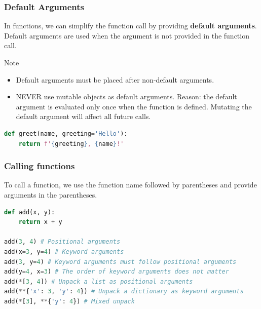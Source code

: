 \documentclass[beamer, en, version=2.0]{huangfusl-template}
\begin{document}
    \begin{frame}[fragile]
        \frametitle{Default Arguments}

        In functions, we can simplify the function call by providing \textbf{default arguments}. Default arguments are used when the argument is not provided in the function call.

        \begin{block}{Note}
            \begin{itemize}
                \item Default arguments must be placed after non-default arguments.
                \item NEVER use mutable objects as default arguments. Reason: the default argument is evaluated only once when the function is defined. Mutating the default argument will affect all future calls.
            \end{itemize}
        \end{block}

\begin{lstlisting}[language=python]
def greet(name, greeting='Hello'):
    return f'{greeting}, {name}!'
\end{lstlisting}
    \end{frame}
    \begin{frame}[fragile]
        \frametitle{Calling functions}

        To call a function, we use the function name followed by parentheses and provide arguments in the parentheses.

\begin{lstlisting}[language=python]
def add(x, y):
    return x + y

add(3, 4) # Positional arguments
add(x=3, y=4) # Keyword arguments
add(3, y=4) # Keyword arguments must follow positional arguments
add(y=4, x=3) # The order of keyword arguments does not matter
add(*[3, 4]) # Unpack a list as positional arguments
add(**{'x': 3, 'y': 4}) # Unpack a dictionary as keyword arguments
add(*[3], **{'y': 4}) # Mixed unpack
\end{lstlisting}
    \end{frame}
\end{document}
